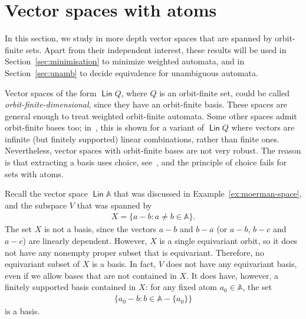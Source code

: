 \documentclass{theoretics}
\newcommand{\set}[1]{\{#1\}}
\newcommand{\atoms}{\mathbb A}
\DeclareMathOperator{\lin}{\mathsf{Lin}}
\begin{document}
\section{Vector spaces with atoms}
\label{sec:vector-spaces}
In this section, we study in more depth vector spaces that are spanned by orbit-finite sets.  Apart from their independent interest, these results will be used in Section~\ref{sec:minimisation} to minimize weighted automata, and in Section~\ref{sec:unamb} to decide equivalence for unambiguous automata.

Vector spaces of the form $\lin Q$, where $Q$ is an orbit-finite set, could be called {\em orbit-finite-dimensional}, since they have an orbit-finite basis. These spaces are general enough to treat weighted orbit-finite automata. Some other spaces admit orbit-finite bases too; in~\cite[Thm.~3.3]{GHL22}, this is shown for a variant of $\lin Q$ where vectors are infinite (but finitely supported) linear combinations, rather than finite ones. Nevertheless, vector spaces with orbit-finite bases are not very robust.  The reason is that extracting a basis uses choice, see~\cite[Thm.~1]{blassbases}, and the principle of choice fails for sets with atoms.





\begin{example}
    \label{ex:no-equivariant-basis}
    Recall the vector space  $\lin \atoms$ that was discussed in Example~\ref{ex:moerman-space}, and the subspace $V$ that was spanned by
    \begin{align*}
        X = \set{a-b : a \neq b \in \atoms}.
    \end{align*}
    The set $X$ is not a basis, since the vectors $a-b$ and $b-a$ (or $a-b$, $b-c$ and $a-c$) are linearly dependent. However, $X$ is a single equivariant orbit, so it does not have any nonempty proper subset that is equivariant. Therefore, no equivariant subset of $X$ is a basis. In fact, $V$ does not have any equivariant basis, even if we allow bases that are not contained in $X$. It does have, however, a finitely supported basis contained in $X$: for any fixed atom $a_0 \in \atoms$, the set
    \begin{align*}
     \set{a_0 - b : b \in \atoms - \set {a_0} }
    \end{align*} 
    is a basis.
\end{example}
\end{document}

